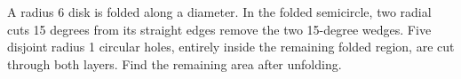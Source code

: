 A radius 6 disk is folded along a diameter. In the folded semicircle, two radial cuts 15 degrees from its straight edges remove the two 15-degree wedges. Five disjoint radius 1 circular holes, entirely inside the remaining folded region, are cut through both layers. Find the remaining area after unfolding.
